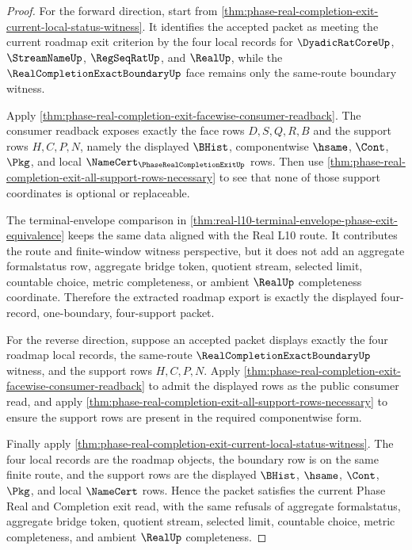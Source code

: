 \begin{proof}
For the forward direction, start from \autoref{thm:phase-real-completion-exit-current-local-status-witness}. It identifies the accepted packet as meeting the current roadmap exit criterion by the four local records for $\DyadicRatCoreUp$, $\StreamNameUp$, $\RegSeqRatUp$, and $\RealUp$, while the $\RealCompletionExactBoundaryUp$ face remains only the same-route boundary witness.

Apply \autoref{thm:phase-real-completion-exit-facewise-consumer-readback}. The consumer readback exposes exactly the face rows $D,S,Q,R,B$ and the support rows $H,C,P,N$, namely the displayed $\BHist$, componentwise $\hsame$, $\Cont$, $\Pkg$, and local $\NameCert_{\PhaseRealCompletionExitUp}$ rows. Then use \autoref{thm:phase-real-completion-exit-all-support-rows-necessary} to see that none of those support coordinates is optional or replaceable.

The terminal-envelope comparison in \autoref{thm:real-l10-terminal-envelope-phase-exit-equivalence} keeps the same data aligned with the Real L10 route. It contributes the route and finite-window witness perspective, but it does not add an aggregate formalstatus row, aggregate bridge token, quotient stream, selected limit, countable choice, metric completeness, or ambient $\RealUp$ completeness coordinate. Therefore the extracted roadmap export is exactly the displayed four-record, one-boundary, four-support packet.

For the reverse direction, suppose an accepted packet displays exactly the four roadmap local records, the same-route $\RealCompletionExactBoundaryUp$ witness, and the support rows $H,C,P,N$. Apply \autoref{thm:phase-real-completion-exit-facewise-consumer-readback} to admit the displayed rows as the public consumer read, and apply \autoref{thm:phase-real-completion-exit-all-support-rows-necessary} to ensure the support rows are present in the required componentwise form.

Finally apply \autoref{thm:phase-real-completion-exit-current-local-status-witness}. The four local records are the roadmap objects, the boundary row is on the same finite route, and the support rows are the displayed $\BHist$, $\hsame$, $\Cont$, $\Pkg$, and local $\NameCert$ rows. Hence the packet satisfies the current Phase Real and Completion exit read, with the same refusals of aggregate formalstatus, aggregate bridge token, quotient stream, selected limit, countable choice, metric completeness, and ambient $\RealUp$ completeness.
\end{proof}

